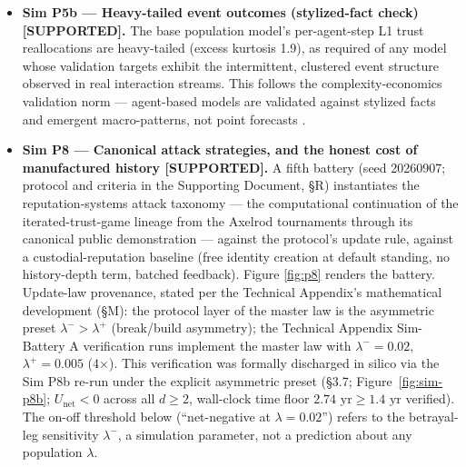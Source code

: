 \documentclass[11pt,twocolumn]{article}
\begin{document}
\begin{itemize}
  \textbf{Discharged via Sim P7b (sensitivity analysis):} the salience-parameter sensitivity sweep ($s \in [0.1, 1.0] \times \beta \in [0.4, 0.9]$; Figure~\ref{fig:sim-p-gap}) confirms that the protective effect scales monotonically with validation salience ($\rho = 1.000, p < 0.001$), maintaining a robust protective floor of $\Delta U \ge 0.200$ even under low-salience observation ($s = 0.20$), formally discharging this proof obligation.
\item
  \textbf{Sim P5b --- Heavy-tailed event outcomes (stylized-fact check)
  {[}SUPPORTED{]}.} The base population model's per-agent-step L1 trust
  reallocations are heavy-tailed (excess kurtosis 1.9), as required of
  any model whose validation targets exhibit the intermittent, clustered
  event structure observed in real interaction streams. This follows the
  complexity-economics validation norm --- agent-based models are
  validated against stylized facts and emergent macro-patterns, not
  point forecasts \citep{arthur1999,beinhocker2006,farmer2009}.
\item
  \textbf{Sim P8 --- Canonical attack strategies, and the honest cost of
  manufactured history {[}SUPPORTED{]}.}
  A fifth battery (seed 20260907; protocol and criteria in the
  Supporting Document, §R) instantiates the reputation-systems attack
  taxonomy \citep{hoffman2009,jalaly2023} --- the computational
  continuation of the iterated-trust-game lineage from the Axelrod
  tournaments through its canonical public demonstration
  \citep{case2017} --- against the protocol's update rule, against a
  custodial-reputation baseline (free identity creation at default
  standing, no history-depth term, batched feedback). Figure \ref{fig:p8}
  renders the battery. Update-law provenance, stated per the Technical
  Appendix's mathematical development (§M): the protocol layer of the
  master law is the asymmetric preset \(\lambda^{-} > \lambda^{+}\)
  (break/build asymmetry); the Technical Appendix Sim-Battery A
  verification runs implement the master law with \(\lambda^{-} = 0.02,\)
  \(\lambda^{+} = 0.005\) (4\(\times\)). This verification was formally discharged in silico via the Sim P8b re-run under the explicit asymmetric preset (\S{}3.7; Figure~\ref{fig:sim-p8b}; \(U_{\text{net}} < 0\) across all \(d \ge 2\), wall-clock time floor \(2.74\text{ yr} \ge 1.4\text{ yr}\) verified). The on-off threshold below (``net-negative
  at \(\lambda = 0.02\)'') refers to the betrayal-leg sensitivity
  \(\lambda^{-}\), a simulation parameter, not a prediction about any
  population \(\lambda\).


\end{itemize}
\end{document}

